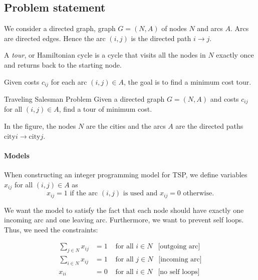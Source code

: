 \subsection*{Problem statement}
We consider a directed graph, graph $G = (N,A)$ of nodes $N$ and arcs $A$.   Arcs are directed edges.  Hence the arc $(i,j)$ is the directed path $i \to j$.

A \emph{tour}, or Hamiltonian cycle %
is a cycle that visits all the nodes in $N$ exactly once and returns back to the starting node. 

Given costs $c_{ij}$ for each arc $(i,j) \in A$, the goal is to find a minimum cost tour.

\begin{general}{Traveling Salesman Problem}{\nphard}
Given a directed graph $G = (N,A)$ and costs $c_{ij}$ for all $(i,j) \in A$, find a tour of minimum cost.
\end{general}
\begin{center}
\end{center}
In the figure, the nodes $N$ are the cities and the arcs $A$ are the directed paths $\text{city} i \to \text{city} j$.

\paragraph{Models}
When constructing an integer programming model for TSP, we define variables $x_{ij}$ for all $(i,j) \in A$ as 
$$
x_{ij } = 1 \text{ if the arc $(i,j)$ is used  and   }  x_{ij} = 0 \text{   otherwise.}
$$

We want the model to satisfy the fact that each node should have exactly one incoming arc and one leaving arc.  Furthermore, we want to prevent self loops.  Thus, we need the constraints:

\begin{align}
\label{eq:tsp-part-model}
\sum_{j\in N} x_{ij} &= 1 & \text{ for all } i \in N \ \ \text{ [outgoing arc]}\\
\sum_{i \in N} x_{ij} &= 1 & \text{ for all } j \in N \ \ \text{ [incoming arc]}\\
\label{eq:tsp-part-model3}
x_{ii} &= 0 & \text{ for all } i \in N \ \ \text{ [no self loops]} 
\end{align}


